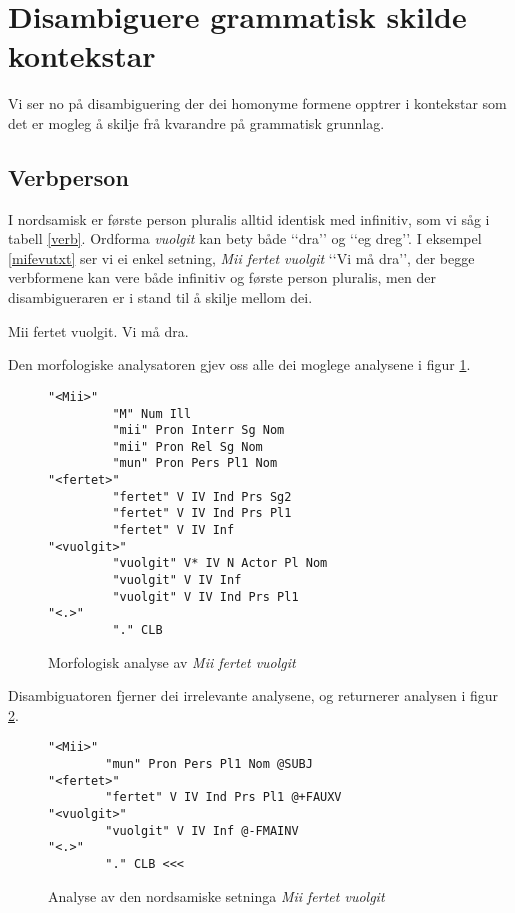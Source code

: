 \documentclass[a4paper,norsk]{article}
\begin{document}
\section{Disambiguere grammatisk skilde kontekstar}



Vi ser no på disambiguering der dei homonyme formene opptrer i kontekstar som det er mogleg å skilje frå kvarandre på grammatisk grunnlag. %

\subsection{Verbperson}

I nordsamisk er første person pluralis alltid identisk med infinitiv, som vi såg i tabell \ref{verb}. Ordforma \textit{vuolgit} kan bety både ‘‘dra’’ og ‘‘eg dreg’’. I eksempel \ref{mifevutxt} ser vi ei enkel setning, \textit{Mii fertet vuolgit} ‘‘Vi må dra’’,  der begge verbformene kan vere både infinitiv og første person pluralis, men der disambigueraren er i stand til å skilje mellom dei. %

\begin{example}\label{mifevutxt}
\gll Mii fertet vuolgit.
 Vi må dra.
\gln 
\glend
\end{example}


Den morfologiske analysatoren gjev oss alle dei moglege analysene i figur \ref{mifevumulti}.%

\begin{figure}[htbp]
\begin{center}
\begin{verbatim}
"<Mii>"
         "M" Num Ill
         "mii" Pron Interr Sg Nom
         "mii" Pron Rel Sg Nom
         "mun" Pron Pers Pl1 Nom
"<fertet>"
         "fertet" V IV Ind Prs Sg2
         "fertet" V IV Ind Prs Pl1
         "fertet" V IV Inf
"<vuolgit>"
         "vuolgit" V* IV N Actor Pl Nom
         "vuolgit" V IV Inf
         "vuolgit" V IV Ind Prs Pl1
"<.>"
         "." CLB
\end{verbatim}
\caption{Morfologisk analyse av \textit{Mii fertet vuolgit}}
\label{mifevumulti}
\end{center}
\end{figure}

Disambiguatoren fjerner dei irrelevante analysene, og returnerer analysen i figur \ref{mifevu}. %

\begin{figure}[htbp]
\begin{center}
\begin{verbatim}
"<Mii>"
        "mun" Pron Pers Pl1 Nom @SUBJ
"<fertet>"
        "fertet" V IV Ind Prs Pl1 @+FAUXV
"<vuolgit>"
        "vuolgit" V IV Inf @-FMAINV
"<.>"
        "." CLB <<<
\end{verbatim}        
\caption{Analyse av den nordsamiske setninga \textit{Mii fertet vuolgit}}
\label{mifevu}
\end{center}
\end{figure}
\end{document}
